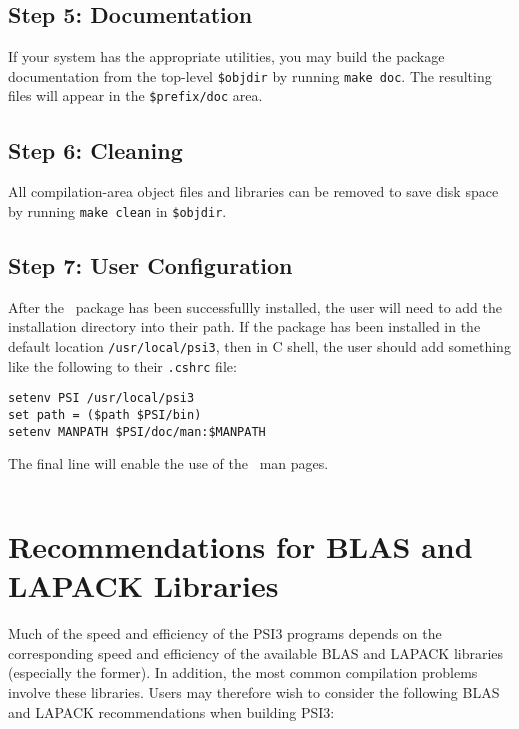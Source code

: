 \documentclass[12pt]{article}
\begin{document}
\subsection{Step 5: Documentation}

If your system has the appropriate utilities, you may build the package
documentation from the top-level {\tt \$objdir} by running {\tt make doc}.  
The resulting files will appear in the {\tt \$prefix/doc} area.

\subsection{Step 6: Cleaning}

All compilation-area object files and libraries can be removed to save
disk space by running {\tt make clean} in {\tt \$objdir}.

\subsection{Step 7: User Configuration}

After the \PSIthree\ package has been successfullly installed, the user will
need to add the installation directory into their path.  If the package
has been installed in the default location {\tt /usr/local/psi3}, then
in C shell, the user should add something like the following to 
their {\tt .cshrc} file:
\begin{verbatim}
setenv PSI /usr/local/psi3
set path = ($path $PSI/bin)
setenv MANPATH $PSI/doc/man:$MANPATH
\end{verbatim}
The final line will enable the use of the \PSIthree\ man pages.
\begin{verbatim}
\end{verbatim}

\section{Recommendations for BLAS and LAPACK Libraries}

Much of the speed and efficiency of the PSI3 programs depends on the
corresponding speed and efficiency of the available BLAS and LAPACK
libraries (especially the former).  In addition, the most common
compilation problems involve these libraries.  Users may therefore
wish to consider the following BLAS and LAPACK recommendations when
building PSI3:
\end{document}
